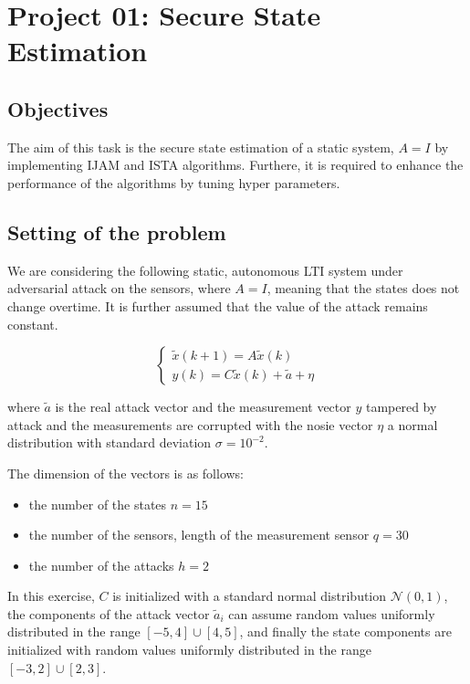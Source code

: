 \chapter{Project 01: Secure State Estimation}

\section{Objectives}
The aim of this task is the secure state estimation of a static system, $A = I$ by implementing IJAM and ISTA algorithms. Furthere, it is required to enhance the performance of the algorithms by tuning hyper parameters.

\section{Setting of the problem}
We are considering the following static, autonomous LTI system under adversarial attack on the sensors, where $A = I$, meaning that the states does not change overtime. It is further assumed that the value of the attack remains constant.

\begin{equation}
    \begin{cases}
        \tilde {x}(k+1) = A\tilde{x}(k) \\
        y(k) = C\tilde{x}(k) + \tilde{a} + \eta
    \end{cases}
\end{equation}

where $\tilde{a}$ is the real attack vector and the measurement vector $y$ tampered by attack and the measurements are corrupted with the nosie vector $\eta$ a normal distribution with standard deviation $\sigma = 10^{-2}$.

The dimension of the vectors is as follows:
\begin{itemize}
	\item the number of the states $n = 15$
	\item the number of the sensors, length of the measurement sensor $q = 30$
	\item the number of the attacks $h = 2$
\end{itemize}

In this exercise, $C$ is initialized with a standard normal distribution $\mathcal{N}(0,1)$, the components of the attack vector $\tilde{a}_i$ can assume random values uniformly distributed in the range $\left[-5, 4\right] \cup \left[4,5 \right]$, and finally the state components are initialized with random values uniformly distributed in the range $\left[-3, 2\right] \cup \left[2,3 \right]$.


